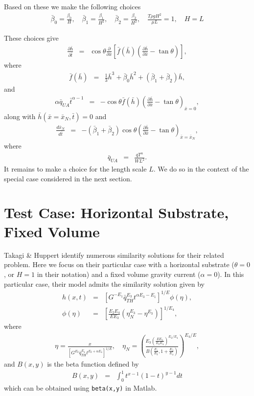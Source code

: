 \documentclass[11pt]{article}
\newcommand{\bea}{\begin{eqnarray}}
\newcommand{\eea}{\end{eqnarray}}
\begin{document}
Based on these we make the following choices
\bea
\bar{\beta}_0 = \frac{\beta_0}{H},\quad
\bar{\beta}_1 = \frac{\beta_1}{H^2},\quad
\bar{\beta}_2 = \frac{\beta_2}{H^2},\quad
\frac{T \rho g H^2}{\mu L} = 1,\quad
H = L
\eea

These choices give
\bea
\frac{\partial \bar{h}}{\partial \bar{t}} & = & \cos \theta \frac{\partial}{\partial \bar{x}} \left[ \bar{f}(\bar{h}) \left( \frac{\partial \bar{h}}{\partial \bar{x}} - \tan \theta \right) \right],
\eea
where
\bea
\bar{f}(\bar{h}) & = & \frac{1}{3} \bar{h}^3 + \bar{\beta}_0 \bar{h}^2 + ( \bar{\beta}_1 + \bar{\beta}_2 ) \bar{h},
\eea
and
\bea
\alpha \bar{q}_{UA} \bar{t}^{\alpha - 1} & = & - \cos \theta \bar{f}(\bar{h}) \left( \frac{\partial \bar{h}}{\partial \bar{x}} - \tan \theta \right)_{\bar{x}=0},
\eea
along with $\bar{h}(\bar{x}=\bar{x}_N,\bar{t}) = 0$ and
\bea
\frac{d\bar{x}_N}{d\bar{t}} & = & - ( \bar{\beta}_1 + \bar{\beta}_2 ) \cos \theta \left( \frac{\partial \bar{h}}{\partial \bar{x}} - \tan \theta \right)_{\bar{x}=\bar{x}_N},
\eea
where
\bea
\bar{q}_{UA} & = & \frac{q T^{\alpha} }{W L^2}.
\eea
It remains to make a choice for the length scale $L$.   We do so in the context of the special case considered in the next section.

\section{Test Case: Horizontal Substrate, Fixed Volume}

Takagi \& Huppert \cite{TH2008} identify numerous similarity solutions for their related problem.  Here we focus on their particular case with a horizontal substrate ($\theta=0$, or $H=1$ 
in their notation) and a fixed volume gravity current ($\alpha=0$).  In this particular case, their model admits the similarity solution given by
\bea
h(x,t) & = & \left[ G^{-E_1} \bar{q}_{TH}^{E_3} t^{\alpha E_3 - E_1} \right]^{1/E} \phi(\eta), \\
\phi(\eta) & = & \left[ \frac{E_2 E_4}{E E_3} \left( \eta_N^{E_3} - \eta^{E_3} \right) \right]^{1/E_4}, 
\eea
where
\bea
\eta = \frac{x}{\left[ G^{E_2} \bar{q}_{TH}^{E_4} t^{E_2 + \alpha E_4} \right]^{1/E}},\quad
\eta_N = \left( \frac{E_3 \left( \frac{E E_3}{E_2 E_4} \right)^{E_2/E_4} }{ B \left( \frac{E_1}{E_3}, 1+ \frac{E_2}{E_4}  \right) } \right)^{E_4/E},
\eea
and $B(x,y)$ is the beta function defined by
\bea
B(x,y) & = & \int_0^1 t^{x-1} (1-t)^{y-1} dt
\eea
which can be obtained using {\tt beta(x,y)} in Matlab.
\end{document}
